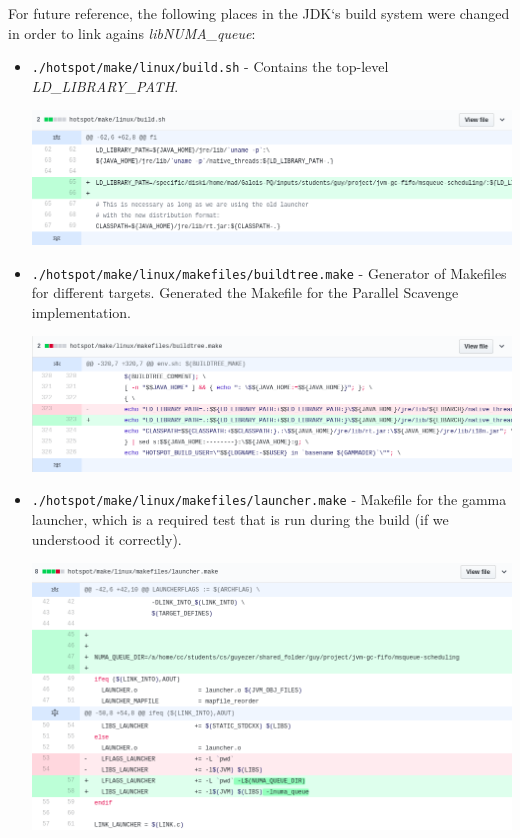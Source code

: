 \documentclass{article}
\begin{document}
 For future reference, the following places in the JDK`s build system were changed in order to link agains \textit{libNUMA\_queue}:
 \begin{itemize}
   \item \texttt{./hotspot/make/linux/build.sh} - Contains the top-level \textit{LD\_LIBRARY\_PATH}.

     \includegraphics[width=\textwidth]{build.png}
   \item \texttt{./hotspot/make/linux/makefiles/buildtree.make} - Generator of Makefiles for different targets. Generated the Makefile for the Parallel Scavenge implementation.

     \includegraphics[width=\textwidth]{buildtree.png}
   \item \texttt{./hotspot/make/linux/makefiles/launcher.make} - Makefile for the gamma launcher, which is a required test that is run during the build (if we understood it correctly).

     \includegraphics[width=\textwidth]{launcher.png}
 \end{itemize}
\end{document}
